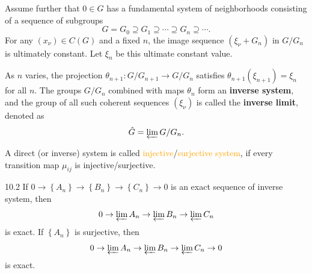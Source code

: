 \begin{definition}
	Assume further that $0\in G$ has a fundamental system of neighborhoods consisting of a sequence of subgroups
	\begin{equation*}
		G=G_0\supseteq G_1\supseteq\cdots\supseteq G_n\supseteq\cdots.
	\end{equation*}
	For any $(x_\nu)\in C(G)$ and a fixed $n$, the image sequence $(\xi_\nu+G_n)$ in $G/G_n$ is ultimately constant. Let $\xi_n$ be this ultimate constant value.

	As $n$ varies, the projection $\theta_{n+1}:G/G_{n+1}\rightarrow G/G_n$ satisfies $\theta_{n+1}\left(\xi_{n+1}\right)=\xi_n$ for all $n$. The groups $G/G_n$ combined with maps $\theta_n$ form an \textbf{inverse system}, and the group of all such coherent sequences $(\xi_\nu)$ is called the \textbf{inverse limit}, denoted as
\begin{equation*}
	\hat{G}=\varprojlim G/G_n.
\end{equation*}
\end{definition}

\begin{definition}
	A direct (or inverse) system is called \textcolor{orange}{injective}/\textcolor{orange}{surjective system}, if every transition map $\mu_{ij}$ is injective/surjective.
\end{definition}

\begin{proposition}{10.2}
	If $0\rightarrow\left\{A_n\right\}\rightarrow\left\{B_n\right\}\rightarrow\left\{C_n\right\}\rightarrow0$ is an exact sequence of inverse system, then
	\begin{equation*}
		0\rightarrow\varprojlim A_n\rightarrow\varprojlim B_n\rightarrow\varprojlim C_n
	\end{equation*}
	is exact. If $\left\{A_n\right\}$ is surjective, then
	\begin{equation*}
		0\rightarrow\varprojlim A_n\rightarrow\varprojlim B_n\rightarrow\varprojlim C_n\rightarrow0
	\end{equation*}
	is exact.
\end{proposition}


